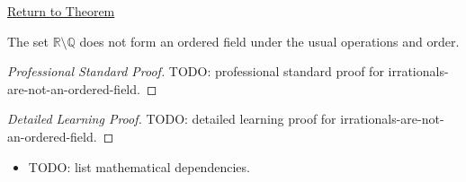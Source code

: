 \newpage
{}
\label{prf:irrationals-are-not-an-ordered-field}

\begin{remark*}[Return]
\hyperref[cor:irrationals-are-not-an-ordered-field]{Return to Theorem}
\end{remark*}

\begin{corollary*}
The set $\mathbb{R}\setminus\mathbb{Q}$ does not form an ordered field under the
usual operations and order.
\end{corollary*}

\begin{proof}[Professional Standard Proof]
\LRAProofBodyStart
TODO: professional standard proof for irrationals-are-not-an-ordered-field.
\end{proof}

\begin{proof}[Detailed Learning Proof]
\LRAProofBodyStart
TODO: detailed learning proof for irrationals-are-not-an-ordered-field.
\end{proof}

\begin{remark*}
\end{remark*}

\begin{dependencies}
\begin{itemize}
  \item TODO: list mathematical dependencies.
\end{itemize}
\end{dependencies}

\clearpage
